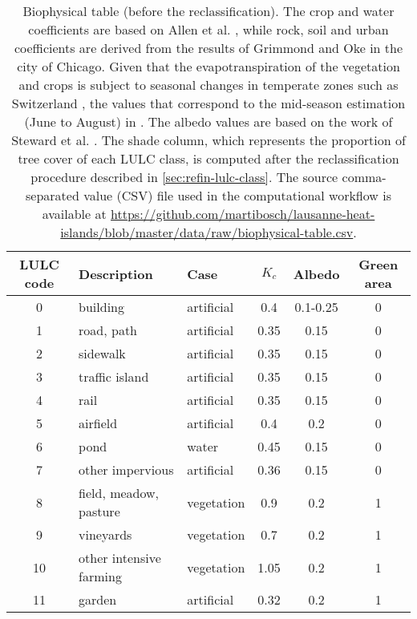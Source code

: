 \documentclass[12pt]{iopart}
\begin{document}
\begin{table}
    \caption{\label{tab:biophysical-table} Biophysical table (before the reclassification). The crop and water coefficients are based on Allen et al. \cite{allen1998crop}, while rock, soil and urban coefficients are derived from the results of Grimmond and Oke \cite{grimmond1999evapotranspiration} in the city of Chicago. Given that the evapotranspiration of the vegetation and crops is subject to seasonal changes in temperate zones such as Switzerland \cite{allen1998crop}, the values that correspond to the mid-season estimation (June to August) in \cite{nistor2016mapping}.
The albedo values are based on the work of Steward et al. \cite{stewart2012local}.
The shade column, which represents the proportion of tree cover of each LULC class, is computed after the reclassification procedure described in \autoref{sec:refin-lulc-class}.
The source comma-separated value (CSV) file used in the computational workflow is available at \url{https://github.com/martibosch/lausanne-heat-islands/blob/master/data/raw/biophysical-table.csv}.}
    \begin{center}
      \begin{tabular}{ c p{} p{} c c c }
        \toprule
        LULC code & Description & Case & $K_c$ & Albedo & Green area \\
        \midrule
        0 & building & artificial & 0.4 & 0.1-0.25 & 0 \\ %
        1 & road, path & artificial & 0.35 & 0.15 & 0 \\ %
        2 & sidewalk & artificial & 0.35 & 0.15 & 0 \\
        3 & traffic island & artificial & 0.35 & 0.15 & 0 \\
        4 & rail & artificial & 0.35 & 0.15 & 0 \\
        5 & airfield & artificial & 0.4 & 0.2 & 0 \\
        6 & pond & water & 0.45 & 0.15 & 0 \\
        7 & other impervious & artificial & 0.36 & 0.15 & 0 \\
        8 & field, meadow, pasture & vegetation & 0.9 & 0.2 & 1 \\
        9 & vineyards & vegetation & 0.7 & 0.2 & 1 \\
        10 & other intensive farming & vegetation & 1.05 & 0.2 & 1 \\
        11 & garden & artificial & 0.32 & 0.2 & 1 \\

\end{tabular}
\end{center}
\end{table}
\end{document}
